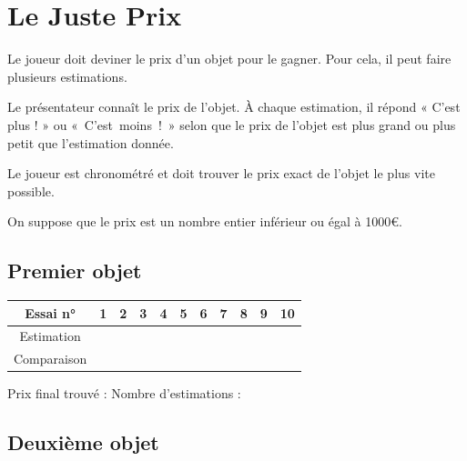 

\SetDate[17/04/2026]

\usepackage{minted}

\def\arraystretch{2}
\setlength\tabcolsep{18pt}


\pagestyle{fancy}
\fancyhead[R]{\today}

\section*{Le Juste Prix}

\begin{namedtheorem}
	Le joueur doit deviner le prix d'un objet pour le gagner.
	Pour cela, il peut faire plusieurs estimations.
	
	Le présentateur connaît le prix de l'objet. 
	À chaque estimation, il répond « C'est plus ! » ou \mbox{« C'est moins ! »} selon que le prix de l'objet est plus grand ou plus petit que l'estimation donnée.
	
	Le joueur est chronométré et doit trouver le prix exact de l'objet le plus vite possible.
\end{namedtheorem}

	On suppose que le prix est un nombre entier inférieur ou égal à 1000€.

\subsection*{Premier objet}

\hspace{-40pt}
\begin{tabular}{|*{11}{c|}}\hline
	Essai n° & 1 & 2 & 3 & 4 & 5 & 6 & 7 & 8 & 9 & 10 
	\\\hline
	Estimation & & & & & & & & & &
	\\\hline
	Comparaison & & & & & & & & & &
	\\\hline
\end{tabular}

\vspace{10pt}
Prix final trouvé :
\hspace{6cm}
Nombre d'estimations :

\subsection*{Deuxième objet}

